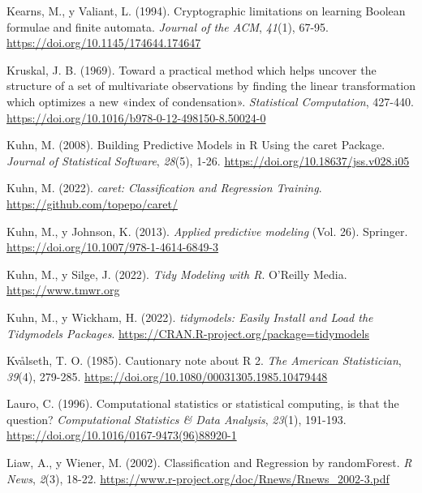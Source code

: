 \documentclass[
]{book}
\newlength{\cslhangindent}
\newlength{\cslentryspacingunit} %
\newenvironment{CSLReferences}[2] %
 {%
  \setlength{\parindent}{0pt}
  \ifodd #1
  \let\oldpar\par
  \def\par{\hangindent=\cslhangindent\oldpar}
  \fi
  \setlength{\parskip}{#2\cslentryspacingunit}
 }%
 {}
\theoremstyle{break}
\theoremstyle{nonumberplain}
\begin{document}
\begin{CSLReferences}{1}{0}
\leavevmode{}%
Kearns, M., y Valiant, L. (1994). Cryptographic limitations on learning {Boolean} formulae and finite automata. \emph{Journal of the ACM}, \emph{41}(1), 67-95. \url{https://doi.org/10.1145/174644.174647}

\leavevmode{}%
Kruskal, J. B. (1969). Toward a practical method which helps uncover the structure of a set of multivariate observations by finding the linear transformation which optimizes a new {«index of condensation»}. \emph{Statistical Computation}, 427-440. \url{https://doi.org/10.1016/b978-0-12-498150-8.50024-0}

\leavevmode{}%
Kuhn, M. (2008). Building Predictive Models in R Using the caret Package. \emph{Journal of Statistical Software}, \emph{28}(5), 1-26. \url{https://doi.org/10.18637/jss.v028.i05}

\leavevmode{}%
Kuhn, M. (2022). \emph{caret: Classification and Regression Training}. \url{https://github.com/topepo/caret/}

\leavevmode{}%
Kuhn, M., y Johnson, K. (2013). \emph{Applied predictive modeling} (Vol. 26). Springer. \url{https://doi.org/10.1007/978-1-4614-6849-3}

\leavevmode{}%
Kuhn, M., y Silge, J. (2022). \emph{Tidy Modeling with R}. O'Reilly Media. \url{https://www.tmwr.org}

\leavevmode{}%
Kuhn, M., y Wickham, H. (2022). \emph{tidymodels: Easily Install and Load the Tidymodels Packages}. \url{https://CRAN.R-project.org/package=tidymodels}

\leavevmode{}%
Kvålseth, T. O. (1985). Cautionary note about R 2. \emph{The American Statistician}, \emph{39}(4), 279-285. \url{https://doi.org/10.1080/00031305.1985.10479448}

\leavevmode{}%
Lauro, C. (1996). Computational statistics or statistical computing, is that the question? \emph{Computational Statistics \& Data Analysis}, \emph{23}(1), 191-193. \url{https://doi.org/10.1016/0167-9473(96)88920-1}

\leavevmode{}%
Liaw, A., y Wiener, M. (2002). Classification and Regression by {randomForest}. \emph{R News}, \emph{2}(3), 18-22. \url{https://www.r-project.org/doc/Rnews/Rnews_2002-3.pdf}


\end{CSLReferences}
\end{document}
